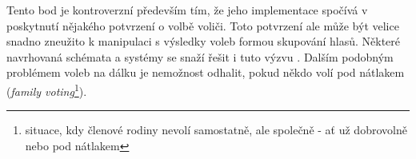 Tento bod je kontroverzní především tím, že jeho implementace spočívá v poskytnutí nějakého potvrzení o volbě voliči. Toto potvrzení ale může být velice snadno zneužito k manipulaci s výsledky voleb formou skupování hlasů. Některé navrhovaná schémata a systémy se snaží řešit i tuto výzvu \cite{receiptFree}. Dalším podobným problémem voleb na dálku je nemožnost odhalit, pokud někdo volí pod nátlakem (\textit{family voting}\footnote{situace, kdy členové rodiny nevolí samostatně, ale společně - ať už dobrovolně nebo pod nátlakem}).